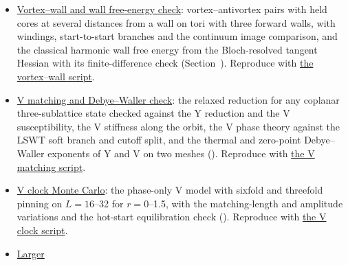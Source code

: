 \begin{itemize}
  \href{../../../data-space/verification/261003-y-wall-junction/wall-junction-check.json}{Wall
  and junction check}: slab-free strips with three forward or three
  backward walls, the phase jump of a forward wall at \(J_{PD}=0\), the
  pinning of the absolute angle against the free distance at
  \(J_{PD}=0.010\) meV, and honeycomb networks of forward walls with the
  bulk winding at each junction
  (Section~). Reproduce with
  \href{../../../examples/nbcp_y_wall_junction.py}{the junction script}.
\item
  \href{../../../data-space/verification/261005-y-vortex-wall/vortex-wall-check.json}{Vortex--wall
  and wall free-energy check}: vortex--antivortex pairs with held cores
  at several distances from a wall on tori with three forward walls,
  with windings, start-to-start branches and the continuum image
  comparison, and the classical harmonic wall free energy from the
  Bloch-resolved tangent Hessian with its finite-difference check
  (Section~). Reproduce with
  \href{../../../examples/nbcp_y_vortex_wall.py}{the vortex--wall script}.
\item
  \href{../../../data-space/verification/261005-v-matching-debye-waller/v-matching-debye-waller.json}{V
  matching and Debye--Waller check}: the relaxed reduction for any
  coplanar three-sublattice state checked against the Y reduction and the
  V susceptibility, the V stiffness along the orbit, the V phase theory
  against the LSWT soft branch and cutoff split, and the thermal and
  zero-point Debye--Waller exponents of Y and V on two meshes
  (). Reproduce with
  \href{../../../examples/nbcp_v_matching_debye_waller.py}{the V matching script}.
\item
  \href{../../../data-space/verification/261005-v-clock-pinning-mc/v-clock-pinning-mc.json}{V
  clock Monte Carlo}: the phase-only V model with sixfold and threefold
  pinning on \(L=16\)--32 for \(r=0\)--1.5, with the matching-length
  and amplitude variations and the hot-start equilibration check
  (). Reproduce with
  \href{../../../examples/nbcp_v_clock_pinning_mc.py}{the V clock script}.
\item
  \href{../../../data-space/verification/261005-nbcp-hatched-region/hatched-region-check.json}{Larger
}
\end{itemize}

